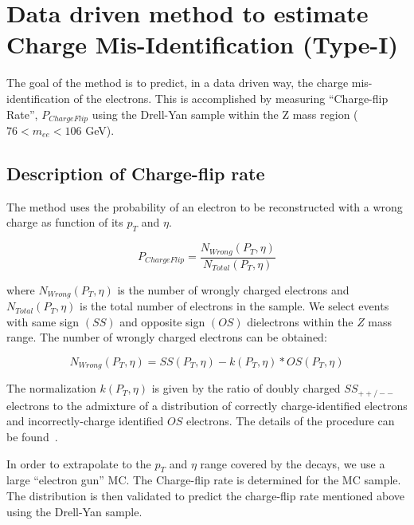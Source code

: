 \section{Data driven method to estimate Charge Mis-Identification (Type-I)}
\label{sec:chargemisid}

The goal of the method is to predict, in a data driven way, the charge 
mis-identification of the electrons. This is accomplished
by measuring ``Charge-flip Rate'', $P_{ChargeFlip}$ using the Drell-Yan sample within the Z mass region
($76 < m_{ee} < 106 $ GeV). 

\subsection{Description of Charge-flip rate}

The method uses the probability of an electron to be reconstructed 
with a wrong charge as function of its $p_T$ and $\eta$.

\begin{equation}
P_{ChargeFlip} = \frac{N_{Wrong}(P_T, \eta)}{N_{Total}(P_T, \eta)}
\end{equation}

where $N_{Wrong}(P_T, \eta)$ is the number of wrongly charged electrons  and $N_{Total}(P_T, \eta)$ is 
the total number of electrons in the sample. We select events with same sign $(SS)$ 
and opposite sign $(OS)$ dielectrons within the $Z$ mass range. The number of wrongly 
charged electrons can be obtained:

\begin{equation}
  N_{Wrong}(P_T, \eta) = SS(P_T, \eta) - k(P_T, \eta) * OS(P_T, \eta) 
\end{equation}

The normalization $k(P_T, \eta)$ is given by the ratio of doubly charged $SS_{++/--}$ electrons to the 
admixture of a distribution of correctly charge-identified electrons and incorrectly-charge 
identified $OS$ electrons. The details of the procedure can be found~\cite{chargefake}. 

In order to extrapolate to the $p_T$ and $\eta$ range covered by the \ttbar decays, we use a 
large ``electron gun'' MC. The Charge-flip rate is determined for the MC sample. The 
distribution is then validated to predict the charge-flip rate mentioned above 
using the Drell-Yan sample.

